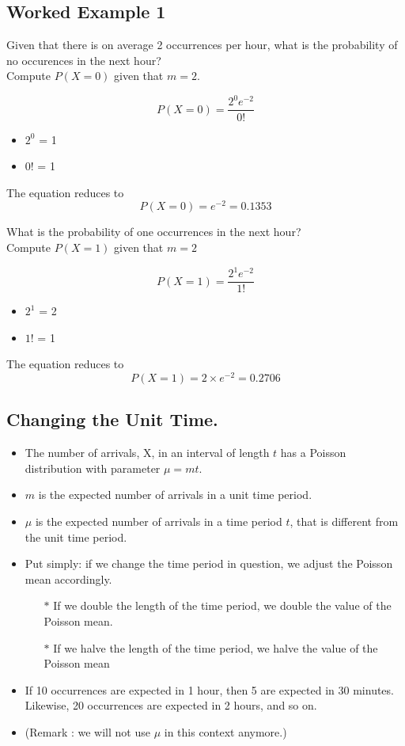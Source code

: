 \documentclass[a4paper,12pt]{article}
\begin{document}
{
\subsection*{Worked Example 1}

	Given that there is on average 2 occurrences per hour, what is the probability of no occurences in the next hour? \\ Compute $P(X=0)$ given that $m=2$.
	
	\[ P(X = 0)=\frac{2^0 e^{-2}}{0!} \]
	\normalsize
	\begin{itemize}
		\item $2^0$ = 1
		\item $0!$ = 1
	\end{itemize}
	The equation reduces to
	\[ P(X = 0)=e^{-2} = 0.1353\]

\noindent What is the probability of one occurrences in the next hour? \\ Compute $P(X=1)$ given that $m=2$
	
	\[ P(X = 1)=\frac{2^1 e^{-2}}{1!} \]
	\normalsize
	\begin{itemize}
		\item $2^1$ = 2
		\item $1!$ = 1
	\end{itemize}
	The equation reduces to
	\[ P(X = 1) = 2 \times e^{-2} = 0.2706\]
}



\subsection*{Changing the Unit Time.}

\begin{itemize}
	\item The number of arrivals, X, in an interval of length $t$ has a
	Poisson distribution with parameter $\mu = mt$.
	\item $m$ is the expected number of arrivals in a unit time period.
	\item $\mu$ is the expected number of arrivals in a time period $t$, that is different from the unit time period.
	\item Put simply: if we change the time period in question, we adjust the Poisson mean accordingly.
	\begin{itemize}
		\item[$\ast$] If we double the length of the time period, we double the value of the Poisson mean.
		\item[$\ast$] If we halve the length of the time period, we halve the value of the Poisson mean
	\end{itemize}
	\item If 10 occurrences are expected in 1 hour, then 5 are expected in 30 minutes. Likewise, 20 occurrences are expected in 2 hours, and so on.
	\item (Remark : we will not use $\mu$ in this context anymore.)
\end{itemize}
\end{document}
